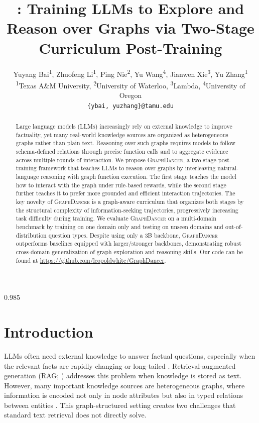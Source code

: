 \documentclass[11pt]{article}
\title{\ours: Training LLMs to Explore and Reason over Graphs via Two-Stage Curriculum Post-Training}
\author{
    Yuyang Bai\textsuperscript{\rm 1}, Zhuofeng Li\textsuperscript{\rm 1}, Ping Nie\textsuperscript{\rm 2}, Yu Wang\textsuperscript{\rm 4}, Jianwen Xie\textsuperscript{\rm 3}, Yu Zhang\textsuperscript{\rm 1} \\
    \textsuperscript{\rm 1}Texas A\&M University,
    \textsuperscript{\rm 2}University of Waterloo,
    \textsuperscript{\rm 3}Lambda,
    \textsuperscript{\rm 4}University of Oregon \\
    \texttt{\{ybai, yuzhang\}@tamu.edu}
}
\newcommand{\ours}{\textsc{GraphDancer}\xspace}
\begin{document}
\maketitle
\begin{spacing}{0.985}
\begin{abstract}
Large language models (LLMs) increasingly rely on external knowledge to improve factuality, yet many real-world knowledge sources are organized as heterogeneous graphs rather than plain text.
Reasoning over such graphs requires models to follow schema-defined relations through precise function calls and to aggregate evidence across multiple rounds of interaction.
We propose \ours, a two-stage post-training framework that teaches LLMs to reason over graphs by interleaving natural-language reasoning with graph function execution.
The first stage teaches the model how to interact with the graph under rule-based rewards, while the second stage further teaches it to prefer more grounded and efficient interaction trajectories.
The key novelty of \ours is a graph-aware curriculum that organizes both stages by the structural complexity of information-seeking trajectories, progressively increasing task difficulty during training.
We evaluate \ours on a multi-domain benchmark by training on one domain only and testing on unseen domains and out-of-distribution question types.
Despite using only a 3B backbone, \ours outperforms baselines equipped with larger/stronger backbones, demonstrating robust cross-domain generalization of graph exploration and reasoning skills. 
Our code can be found at \url{https://github.com/leopoldwhite/GraphDancer}.
\end{abstract}


\section{Introduction}
LLMs often need external knowledge to answer factual questions, especially when the relevant facts are rapidly changing \cite{vu2024freshllms} or long-tailed \cite{sun2024head}.
Retrieval-augmented generation (RAG; \citealp{lewis2020retrieval}) addresses this problem when knowledge is stored as text.
However, many important knowledge sources are heterogeneous graphs, where information is encoded not only in node attributes but also in typed relations between entities \cite{han2024retrieval,sun2024think,ma2025think}.
This graph-structured setting creates two challenges that standard text retrieval does not directly solve.


\end{spacing}
\end{document}
